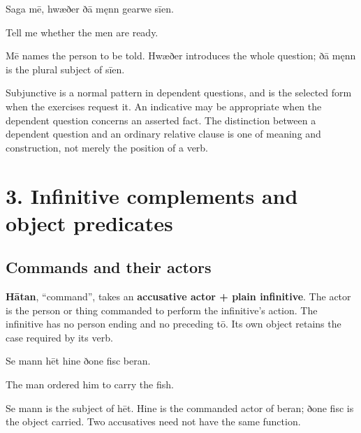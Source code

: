 Saga mē, hwæðer ðā męnn gearwe sīen.

Tell me whether the men are ready.

Mē names the person to be told. Hwæðer introduces the whole question; ðā męnn is the plural subject of sīen.

Subjunctive is a normal pattern in dependent questions, and is the selected form when the exercises request it. An indicative may be appropriate when the dependent question concerns an asserted fact. The distinction between a dependent question and an ordinary relative clause is one of meaning and construction, not merely the position of a verb.

\section*{3. Infinitive complements and object predicates}

\subsection*{Commands and their actors}

\textbf{Hātan}, “command”, takes an \textbf{accusative actor + plain infinitive}. The actor is the person or thing commanded to perform the infinitive’s action. The infinitive has no person ending and no preceding tō. Its own object retains the case required by its verb.

Se mann hēt hine ðone fisc beran.

The man ordered him to carry the fish.

Se mann is the subject of hēt. Hine is the commanded actor of beran; ðone fisc is the object carried. Two accusatives need not have the same function.

